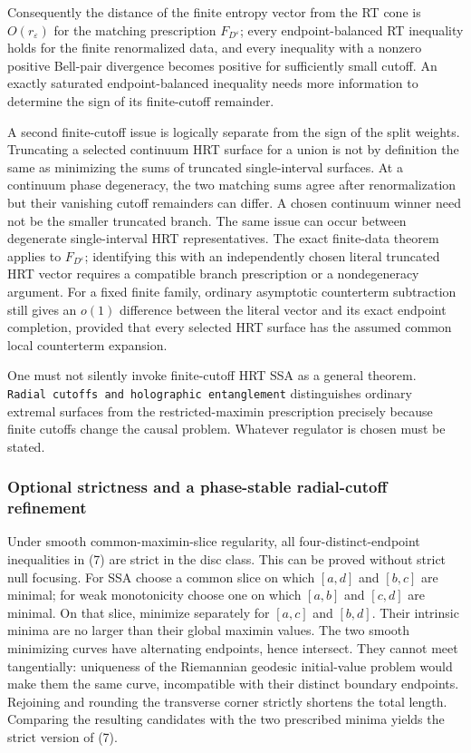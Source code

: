 \documentclass[11pt]{article}
\begin{document}
Consequently the distance of the finite entropy vector from the RT cone
is \(O(r_\varepsilon)\) for the matching prescription
\(F_{D^\varepsilon}\); every endpoint-balanced RT inequality holds for
the finite renormalized data, and every inequality with a nonzero
positive Bell-pair divergence becomes positive for sufficiently small
cutoff. An exactly saturated endpoint-balanced inequality needs more
information to determine the sign of its finite-cutoff remainder.

A second finite-cutoff issue is logically separate from the sign of the
split weights. Truncating a selected continuum HRT surface for a union
is not by definition the same as minimizing the sums of truncated
single-interval surfaces. At a continuum phase degeneracy, the two
matching sums agree after renormalization but their vanishing cutoff
remainders can differ. A chosen continuum winner need not be the smaller
truncated branch. The same issue can occur between degenerate
single-interval HRT representatives. The exact finite-data theorem
applies to \(F_{D^\varepsilon}\); identifying this with an independently
chosen literal truncated HRT vector requires a compatible branch
prescription or a nondegeneracy argument. For a fixed finite family,
ordinary asymptotic counterterm subtraction still gives an \(o(1)\)
difference between the literal vector and its exact endpoint completion,
provided that every selected HRT surface has the assumed common local
counterterm expansion.

One must not silently invoke finite-cutoff HRT SSA as a general theorem.
\texttt{Radial\ cutoffs\ and\ holographic\ entanglement} distinguishes
ordinary extremal surfaces from the restricted-maximin prescription
precisely because finite cutoffs change the causal problem. Whatever
regulator is chosen must be stated.

\subsubsection{Optional strictness and a phase-stable radial-cutoff
refinement}\label{optional-strictness-and-a-phase-stable-radial-cutoff-refinement}

Under smooth common-maximin-slice regularity, all four-distinct-endpoint
inequalities in (7) are strict in the disc class. This can be proved
without strict null focusing. For SSA choose a common slice on which
\([a,d]\) and \([b,c]\) are minimal; for weak monotonicity choose one on
which \([a,b]\) and \([c,d]\) are minimal. On that slice, minimize
separately for \([a,c]\) and \([b,d]\). Their intrinsic minima are no
larger than their global maximin values. The two smooth minimizing
curves have alternating endpoints, hence intersect. They cannot meet
tangentially: uniqueness of the Riemannian geodesic initial-value
problem would make them the same curve, incompatible with their distinct
boundary endpoints. Rejoining and rounding the transverse corner
strictly shortens the total length. Comparing the resulting candidates
with the two prescribed minima yields the strict version of (7).
\end{document}
